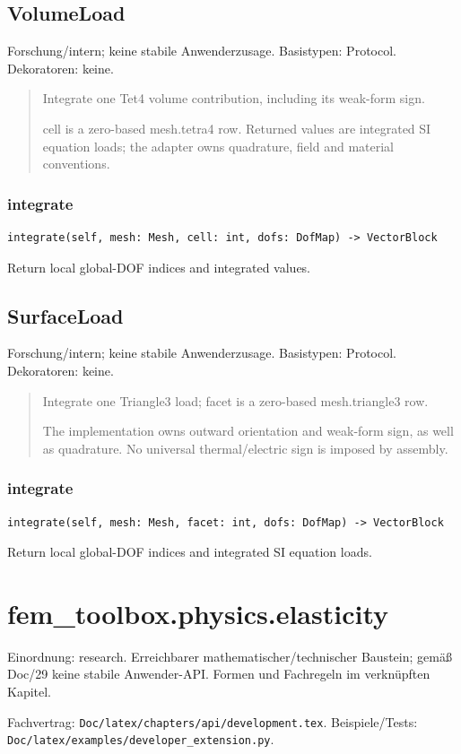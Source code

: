 \subsection{VolumeLoad}
Forschung/intern; keine stabile Anwenderzusage.
Basistypen: Protocol. Dekoratoren: keine.
\begin{quote}
Integrate one Tet4 volume contribution, including its weak-form sign.\par cell is a zero-based mesh.tetra4 row. Returned values are integrated SI equation loads; the adapter owns quadrature, field and material conventions.
\end{quote}
\subsubsection*{integrate}
\begin{lstlisting}
integrate(self, mesh: Mesh, cell: int, dofs: DofMap) -> VectorBlock
\end{lstlisting}
Return local global-DOF indices and integrated values.
\subsection{SurfaceLoad}
Forschung/intern; keine stabile Anwenderzusage.
Basistypen: Protocol. Dekoratoren: keine.
\begin{quote}
Integrate one Triangle3 load; facet is a zero-based mesh.triangle3 row.\par The implementation owns outward orientation and weak-form sign, as well as quadrature. No universal thermal/electric sign is imposed by assembly.
\end{quote}
\subsubsection*{integrate}
\begin{lstlisting}
integrate(self, mesh: Mesh, facet: int, dofs: DofMap) -> VectorBlock
\end{lstlisting}
Return local global-DOF indices and integrated SI equation loads.
\section{fem\_toolbox.physics.elasticity}
Einordnung: research. Erreichbarer mathematischer/technischer Baustein; gemäß Doc/29 keine stabile Anwender-API. Formen und Fachregeln im verknüpften Kapitel.
\par Fachvertrag: \nolinkurl{Doc/latex/chapters/api/development.tex}. Beispiele/Tests:
\nolinkurl{Doc/latex/examples/developer_extension.py}.
